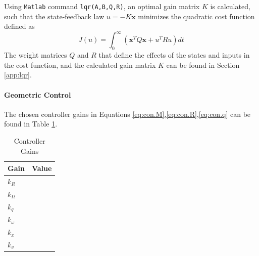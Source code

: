 Using \texttt{Matlab} command \texttt{lqr(A,B,Q,R)}, an optimal gain matrix $ K $ is calculated, such that the state-feedback law $ u=-K\mathbf{x} $ minimizes the quadratic cost function defined as
\begin{equation}\label{key}
J(u)=\int_{0}^{\infty}(\mathbf{x}^TQ\mathbf{x}+u^TRu)dt
\end{equation}
The weight matrices $ Q $ and $ R $ that define the effects of the states and inputs in the cost function, and the calculated gain matrix $K $ can be found in Section \ref{app:lqr}. 


\paragraph{Geometric Control}
The chosen controller gains in Equations \ref{eq:con.M},\ref{eq:con.R},\ref{eq:con.q} can be found in Table \ref{tab:set.gains}.

\begin{table}[h!]
	\centering
	\begin{tabular}{|l|l|}
		\hline
		\textbf{Gain}&\textbf{Value}\\
		\hline
		$ k_R $&\\
		$ k_\Omega $&\\
		$ k_q $&\\
		$ k_\omega $&\\
		$ k_x $&\\
		$ k_v $&\\	
		\hline
	\end{tabular}
	\caption{Controller Gains}
	\label{tab:set.gains}
\end{table}

